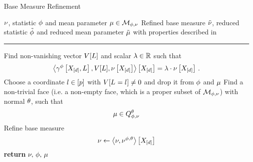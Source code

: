 \begin{algorithm}[h!]
    \caption{Base Measure Refinement}\label{alg:baseMeasureRefinement}
    \begin{algorithmic}
        \Require $\nu$, statistic $\phi$ and mean parameter $\mu\in\mathcal{M}_{\phi,\nu}$
        \Ensure Refined base measure $\tilde{\nu}$, reduced statistic $\tilde{\phi}$ and reduced mean parameter $\tilde{\mu}$ with properties described in 
        \hrule
        \While{$\meanparam\notin\sbinteriorof{\genmeanset}$}
                \State Find non-vanishing vector $V[L]$ and scalar $\lambda\in\mathbb{R}$ such that
                \[ \left\langle \gamma^{\phi}\left[X_{[d]},L\right],V[L],\nu\left[X_{[d]}\right]\right\rangle \left[ X_{[d]} \right] = \lambda\cdot\nu\left[X_{[d]}\right] \, . \]
                \State Choose a coordinate $l\in[p]$ with $V[L_{}=l_{}]\neq0$ and drop it from $\phi$ and $\mu$
            \EndWhile
            \State Find a non-trivial face (i.e. a non-empty face, which is a proper subset of $\mathcal{M}_{\phi,\nu}$) with normal $\theta$, such that
            \[ \mu\in Q^{\theta}_{\phi,\nu} \]
            \State Refine base measure
            \[ \nu \leftarrow \left\langle \nu,\nu^{\phi,\theta}\right\rangle \left[ X_{[d]} \right] \]
        \EndWhile
        \State \textbf{return} $\nu, \, \phi,\,\mu$
    \end{algorithmic}
\end{algorithm}

